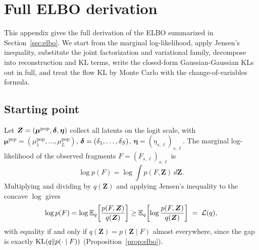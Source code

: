 \section{Full ELBO derivation}
\label{app:elbo}

This appendix gives the full derivation of the ELBO summarized in Section~\ref{sec:elbo}. We start from the marginal log-likelihood, apply Jensen's inequality, substitute the joint factorization and variational family, decompose into reconstruction and KL terms, write the closed-form Gaussian-Gaussian KLs out in full, and treat the flow KL by Monte Carlo with the change-of-variables formula.

\subsection*{Starting point}
Let $\bm Z=(\bm\mu^{\mathrm{pop}},\boldsymbol{\delta},\bm\eta)$ collect all latents on the logit scale, with $\bm\mu^{\mathrm{pop}}=(\mu^{\mathrm{pop}}_1,\dots,\mu^{\mathrm{pop}}_L)$, $\boldsymbol{\delta}=(\delta_1,\dots,\delta_S)$, $\bm\eta=(\eta_{s,\ell})_{s,\ell}$. The marginal log-likelihood of the observed fragments $F=(F_{s,\ell})_{s,\ell}$ is
\begin{equation}
\log p(F) = \log \int p(F,\bm Z)\,d\bm Z.
\end{equation}
Multiplying and dividing by $q(\bm Z)$ and applying Jensen's inequality to the concave $\log$ gives
\begin{equation}
\log p(F) = \log \mathbb{E}_q\!\left[\frac{p(F,\bm Z)}{q(\bm Z)}\right] \ge \mathbb{E}_q\!\left[\log\frac{p(F,\bm Z)}{q(\bm Z)}\right] \;=\; \mathcal{L}(q),
\label{eq:appA-elbo-def}
\end{equation}
with equality if and only if $q(\bm Z)=p(\bm Z\mid F)$ almost everywhere, since the gap is exactly $\mathrm{KL}(q\|p(\cdot\mid F))$ (Proposition~\ref{prop:elbo}).

